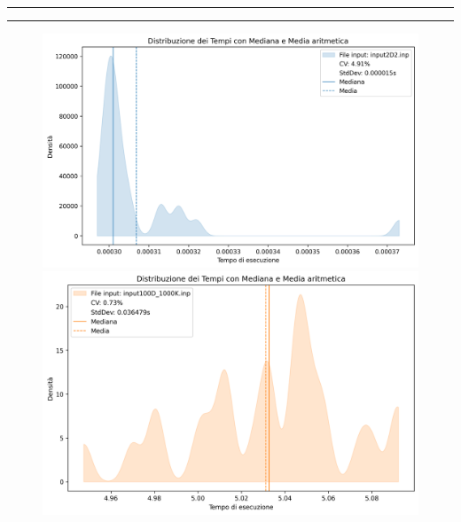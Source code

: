 \documentclass{article}
\begin{document}
  \begin{center}
    \rule{2.5cm}{1pt}  \rule{2.5cm}{1pt}
  \end{center}
  \begin{figure}[ht]
    \centering
    \begin{minipage}{0.45\textwidth}
      \centering
      \includegraphics[width=\linewidth]{../test_csv/plots/time_distribution/time_distribution_2D2_cuda.png}
    \end{minipage}
    \begin{minipage}{0.45\textwidth}
      \centering
      \includegraphics[width=\linewidth]{../test_csv/plots/time_distribution/time_distribution_100D_1000K_cuda.png}
    \end{minipage}
  \end{figure}
\end{document}
